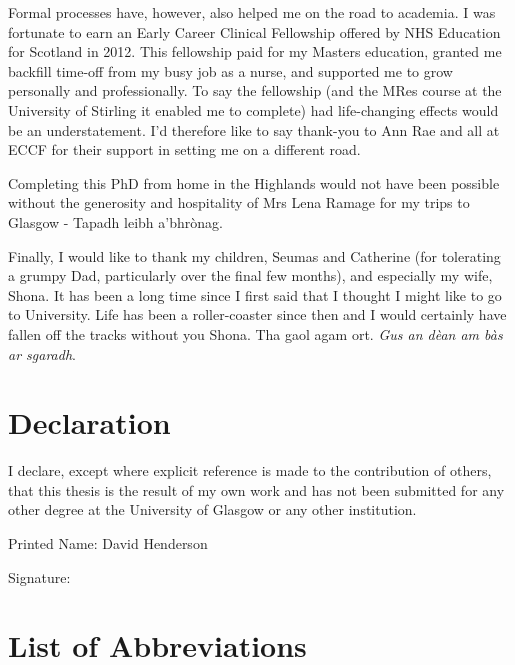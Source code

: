 \documentclass[12pt,a4paper,oneside,table]{report}
\begin{document}
Formal processes have, however, also helped me on the road to academia.
I was fortunate to earn an Early Career Clinical Fellowship offered by
NHS Education for Scotland in 2012. This fellowship paid for my Masters
education, granted me backfill time-off from my busy job as a nurse, and
supported me to grow personally and professionally. To say the
fellowship (and the MRes course at the University of Stirling it enabled
me to complete) had life-changing effects would be an understatement.
I'd therefore like to say thank-you to Ann Rae and all at ECCF for their
support in setting me on a different road.

Completing this PhD from home in the Highlands would not have been
possible without the generosity and hospitality of Mrs Lena Ramage for
my trips to Glasgow - Tapadh leibh a'bhrònag.

Finally, I would like to thank my children, Seumas and Catherine (for
tolerating a grumpy Dad, particularly over the final few months), and
especially my wife, Shona. It has been a long time since I first said
that I thought I might like to go to University. Life has been a
roller-coaster since then and I would certainly have fallen off the
tracks without you Shona. Tha gaol agam ort.
\emph{Gus an dèan am bàs ar sgaradh}.

\newpage
\section*{Declaration}
\fancyhead[CO,CE]{}
\renewcommand{\headrulewidth}{0pt}

\thispagestyle{empty}

I declare, except where explicit reference is made to the contribution
of others, that this thesis is the result of my own work and has not
been submitted for any other degree at the University of Glasgow or any
other institution.

Printed Name: David Henderson

Signature:

\newpage
{}
\vspace{2cm}
\section*{\huge{List of Abbreviations}}\label{acros}
\vspace{1cm}

\end{document}
